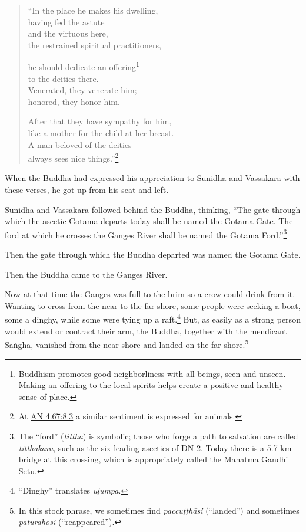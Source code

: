 \documentclass[12pt,openany]{book}%
\begin{document}
\begin{verse}%
“In the place he makes his dwelling, \\
having fed the astute \\
and the virtuous here, \\
the restrained spiritual practitioners, 

he should dedicate an offering\footnote{Buddhism promotes good neighborliness with all beings, seen and unseen. Making an offering to the local spirits helps create a positive and healthy sense of place. } \\
to the deities there. \\
Venerated, they venerate him; \\
honored, they honor him. 

After that they have sympathy for him, \\
like a mother for the child at her breast. \\
A man beloved of the deities \\
always sees nice things.”\footnote{At \href{https://suttacentral.net/an4.67/en/sujato\#8.3}{AN 4.67:8.3} a similar sentiment is expressed for animals. } 

%
\end{verse}

When the Buddha had expressed his appreciation to Sunidha and \textsanskrit{Vassakāra} with these verses, he got up from his seat and left. 

Sunidha and \textsanskrit{Vassakāra} followed behind the Buddha, thinking, “The gate through which the ascetic Gotama departs today shall be named the Gotama Gate. The ford at which he crosses the Ganges River shall be named the Gotama Ford.”\footnote{The “ford” (\textit{tittha}) is symbolic; those who forge a path to salvation are called \textit{titthakara}, such as the six leading ascetics of \href{https://suttacentral.net/dn2/en/sujato}{DN 2}. Today there is a 5.7 km bridge at this crossing, which is appropriately called the Mahatma Gandhi Setu. } 

Then the gate through which the Buddha departed was named the Gotama Gate. 

Then the Buddha came to the Ganges River. 

Now at that time the Ganges was full to the brim so a crow could drink from it. Wanting to cross from the near to the far shore, some people were seeking a boat, some a dinghy, while some were tying up a raft.\footnote{“Dinghy” translates \textit{\textsanskrit{uḷumpa}}. } But, as easily as a strong person would extend or contract their arm, the Buddha, together with the mendicant \textsanskrit{Saṅgha}, vanished from the near shore and landed on the far shore.\footnote{In this stock phrase, we sometimes find \textit{\textsanskrit{paccuṭṭhāsi}} (“landed”) and sometimes \textit{\textsanskrit{pāturahosi}} (“reappeared”). } 
\end{document}
